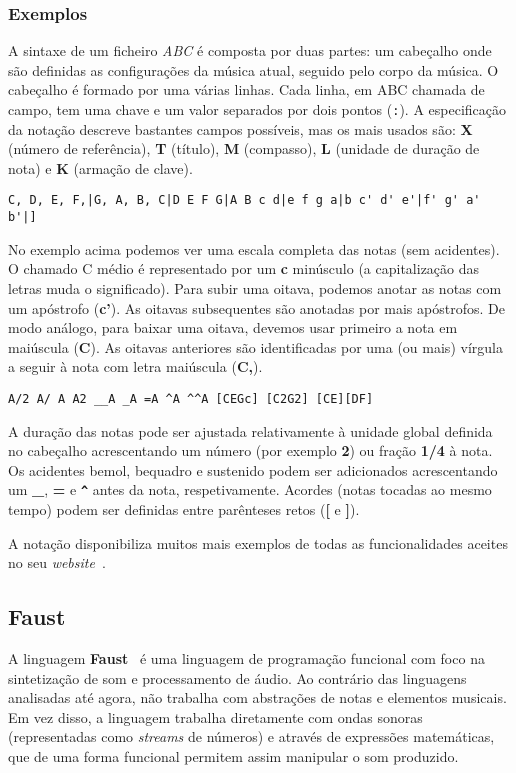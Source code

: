     \subsubsection{Exemplos}
A sintaxe de um ficheiro \textit{ABC} é composta por duas partes: um cabeçalho onde são definidas as configurações da música atual, seguido pelo corpo da música. O cabeçalho é formado por uma várias linhas. Cada linha, em ABC chamada de campo, tem uma chave e um valor separados por dois pontos (\texttt{:}). A especificação da notação descreve bastantes campos possíveis, mas os mais usados são: \textbf{X} (número de referência), \textbf{T} (título), \textbf{M} (compasso), \textbf{L} (unidade de duração de nota) e \textbf{K} (armação de clave).

\begin{lstlisting}[caption={Exemplo da notação ABC}]
C, D, E, F,|G, A, B, C|D E F G|A B c d|e f g a|b c' d' e'|f' g' a' b'|]
\end{lstlisting}

No exemplo acima podemos ver uma escala completa das notas (sem acidentes). O chamado C médio é representado por um \textbf{c} minúsculo (a capitalização das letras muda o significado). Para subir uma oitava, podemos anotar as notas com um apóstrofo (\textbf{c'}). As oitavas subsequentes são anotadas por mais apóstrofos. De modo análogo, para baixar uma oitava, devemos usar primeiro a nota em maiúscula (\textbf{C}). As oitavas anteriores são identificadas por uma (ou mais) vírgula a seguir à nota com letra maiúscula (\textbf{C,}).


\begin{lstlisting}[caption={Exemplo da notação ABC}]
A/2 A/ A A2 __A _A =A ^A ^^A [CEGc] [C2G2] [CE][DF]
\end{lstlisting}
A duração das notas pode ser ajustada relativamente à unidade global definida no cabeçalho acrescentando um número (por exemplo \textbf{2}) ou fração \textbf{1/4} à nota. Os acidentes bemol, bequadro e sustenido podem ser adicionados acrescentando um \textbf{\_}, \textbf{=} e \textbf{\texttt{\textasciicircum{}}} antes da nota, respetivamente. Acordes (notas tocadas ao mesmo tempo) podem ser definidas entre parênteses retos (\textbf{[} e \textbf{]}).

A notação disponibiliza muitos mais exemplos de todas as funcionalidades aceites no seu \textit{website}~\citep{abc-notation-examples}.

\subsection{Faust}
A linguagem \textbf{Faust}~\citep{orlarey:Faust, orlarey:hal-02158894} é uma linguagem de programação funcional com foco na sintetização de som e processamento de áudio. Ao contrário das linguagens analisadas até agora, não trabalha com abstrações de notas e elementos musicais. Em vez disso, a linguagem trabalha diretamente com ondas sonoras (representadas como \textit{streams} de números) e através de expressões matemáticas, que de uma forma funcional permitem assim manipular o som produzido.

